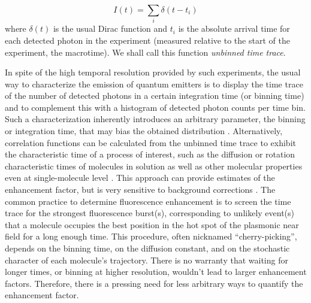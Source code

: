 \begin{equation}
I(t) = \sum_i \delta( t-t_i)
\label{eq:intensity_TCSPC}
\end{equation}
where $\delta(t)$ is the usual Dirac function and $t_i$ is the absolute arrival time
for each detected photon in the experiment (measured relative to the start of the experiment, the macrotime). 
We shall call this function \textit{unbinned time trace}. 
 


In spite of the high temporal resolution provided by such experiments, 
the usual way to characterize the emission of quantum emitters is to 
display the time trace of the number of detected photons 
in a certain integration time (or binning time) and to
complement this with a histogram of detected photon counts per time bin. 
Such a characterization inherently introduces an arbitrary parameter, 
the binning or integration time, that may bias the obtained distribution \cite{Lippitz2005}. 
Alternatively, correlation functions can be calculated from the unbinned
 time trace to exhibit the characteristic 
time of a process of interest, such as the diffusion \cite{magde1972thermodynamic,haustein2007fluorescence} 
or rotation \cite{loman2010measuring} characteristic times of molecules in solution as well as 
other molecular properties even at single-molecule level \cite{medina2002fluorescence, ghosh2017quantifying}.
This approach can provide estimates of the enhancement factor, but is very sensitive to 
background corrections \cite{pradhan2016goldnanorodenhanced, langguth2014simple}. 
The common practice to determine fluorescence enhancement is to screen the time trace 
for the strongest fluorescence burst(s), corresponding to unlikely event(s) that a 
molecule occupies the best position in the hot spot of the plasmonic near field for 
a long enough time. This procedure, often nicknamed ``cherry-picking'', depends on the 
binning time, on the diffusion constant, and on the stochastic character of each 
molecule's trajectory. There is no warranty that waiting for longer times, or binning 
at higher resolution, wouldn't lead to larger enhancement factors. Therefore, there 
is a pressing need for less arbitrary ways to quantify the enhancement factor. 

